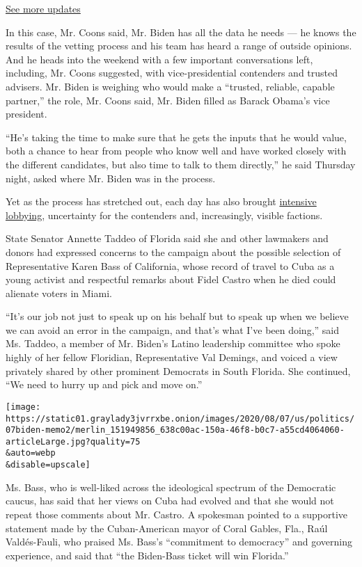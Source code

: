 \href{https://www.nytimes3xbfgragh.onion/2020/08/07/us/elections/trump-biden.html?action=click\&pgtype=Article\&state=default\&region=MAIN_CONTENT_1\&context=storylines_live_updates}{See
more updates}

In this case, Mr. Coons said, Mr. Biden has all the data he needs --- he
knows the results of the vetting process and his team has heard a range
of outside opinions. And he heads into the weekend with a few important
conversations left, including, Mr. Coons suggested, with
vice-presidential contenders and trusted advisers. Mr. Biden is weighing
who would make a ``trusted, reliable, capable partner,'' the role, Mr.
Coons said, Mr. Biden filled as Barack Obama's vice president.

``He's taking the time to make sure that he gets the inputs that he
would value, both a chance to hear from people who know well and have
worked closely with the different candidates, but also time to talk to
them directly,'' he said Thursday night, asked where Mr. Biden was in
the process.

Yet as the process has stretched out, each day has also brought
\href{https://www.nytimes3xbfgragh.onion/2020/07/31/us/politics/joseph-biden-vice-president.html}{intensive
lobbying}, uncertainty for the contenders and, increasingly, visible
factions.

State Senator Annette Taddeo of Florida said she and other lawmakers and
donors had expressed concerns to the campaign about the possible
selection of Representative Karen Bass of California, whose record of
travel to Cuba as a young activist and respectful remarks about Fidel
Castro when he died could alienate voters in Miami.

``It's our job not just to speak up on his behalf but to speak up when
we believe we can avoid an error in the campaign, and that's what I've
been doing,'' said Ms. Taddeo, a member of Mr. Biden's Latino leadership
committee who spoke highly of her fellow Floridian, Representative Val
Demings, and voiced a view privately shared by other prominent Democrats
in South Florida. She continued, ``We need to hurry up and pick and move
on.''

\texttt{[image: https://static01.graylady3jvrrxbe.onion/images/2020/08/07/us/politics/07biden-memo2/merlin\_151949856\_638c00ac-150a-46f8-b0c7-a55cd4064060-articleLarge.jpg?quality=75\\\&auto=webp\\\&disable=upscale]}

Ms. Bass, who is well-liked across the ideological spectrum of the
Democratic caucus, has said that her views on Cuba had evolved and that
she would not repeat those comments about Mr. Castro. A spokesman
pointed to a supportive statement made by the Cuban-American mayor of
Coral Gables, Fla., Raúl Valdés-Fauli, who praised Ms. Bass's
``commitment to democracy'' and governing experience, and said that
``the Biden-Bass ticket will win Florida.''

